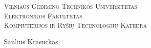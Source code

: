 \documentclass[12pt]{article}
\begin{document}


\begin{titlepage}
\centering

{\scshape
    {\Large Vilniaus Gedimino Technikos Universitetas}    \\[0.063\baselineskip]
    {\large Elektronikos Fakultetas}                      \\[0.007\baselineskip]
    {\large Kompiuterijos ir Ryšių Technologijų Katedra}
}

    \vspace{\fill}

    {\large Saulius Krasuckas}                            \\ %

    \vspace{\fill}

\end{titlepage}

\restoregeometry                       %

  \blindtext[10]                       %
\end{document}
